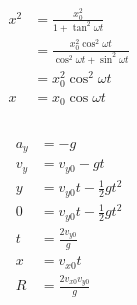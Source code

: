 \documentclass{article}
\begin{document}
\begin{align*}
  x^2                                                                             & = \frac{x_0^2}{1 + \tan^2 \omega t}                                 \\
                                                                                  & = \frac{x_0^2 \cos^2 \omega t}{\cos^2 \omega t + \sin^2 \omega t}   \\
                                                                                  & = x_0^2 \cos^2 \omega t                                             \\
  x                                                                               & = x_0 \cos \omega t
\end{align*}

\setcounter{subsection}{14}
\subsection{}

\begin{align*}
  a_y & = -g                           \\
  v_y & = v_{y0} - g t                 \\
  y   & = v_{y0} t - \frac{1}{2} g t^2 \\
  0   & = v_{y0} t - \frac{1}{2} g t^2 \\
  t   & = \frac{2 v_{y0}}{g}           \\
  x   & = v_{x0} t                     \\
  R   & = \frac{2 v_{x0} v_{y0}}{g}
\end{align*}

\setcounter{subsection}{18}
\subsection{}
\end{document}
